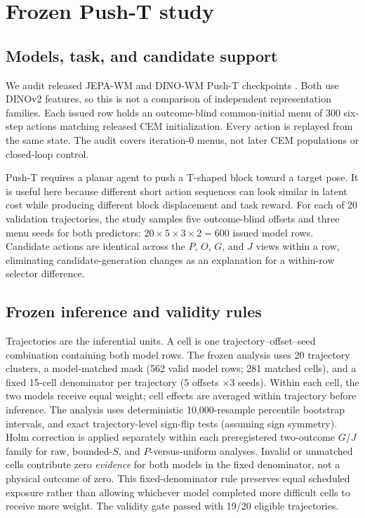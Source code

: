 \documentclass[letterpaper,10pt,conference]{ieeeconf}
\begin{document}
\section{Frozen Push-T study}

\subsection{Models, task, and candidate support}

We audit released JEPA-WM and DINO-WM Push-T checkpoints
\cite{terver2026drives,pmlr-v267-zhou25t}. Both use DINOv2 features, so this is
not a comparison of independent representation families. Each issued row holds
an outcome-blind common-initial menu of 300 six-step actions matching released
CEM initialization. Every action is replayed from the same state. The audit
covers iteration-0 menus, not later CEM populations or closed-loop control.

Push-T requires a planar agent to push a T-shaped block toward a target pose.
It is useful here because different short action sequences can look similar in
latent cost while producing different block displacement and task reward. For
each of 20 validation trajectories, the study samples five outcome-blind
offsets and three menu seeds for both predictors: $20\times5\times3\times2=600$
issued model rows. Candidate actions are identical across
the $P$, $O$, $G$, and $J$ views within a row, eliminating candidate-generation
changes as an explanation for a within-row selector difference.

\subsection{Frozen inference and validity rules}

Trajectories are the inferential units. A cell is one
trajectory--offset--seed combination containing both model rows. The frozen
analysis uses 20 trajectory clusters, a model-matched mask (562 valid model
rows; 281 matched cells), and a fixed 15-cell denominator per trajectory
($5$ offsets $\times3$ seeds). Within each cell, the two models receive equal
weight; cell effects are averaged within trajectory before inference. The
analysis uses deterministic
10,000-resample percentile bootstrap intervals, and exact trajectory-level
sign-flip tests (assuming sign symmetry). Holm correction is applied separately
within each preregistered two-outcome $G/J$ family for raw, bounded-$S$, and
$P$-versus-uniform analyses. Invalid or unmatched cells contribute zero
\emph{evidence} for both models in the fixed denominator, not a physical outcome
of zero. This fixed-denominator rule preserves equal scheduled exposure rather than
allowing whichever model completed more difficult cells to receive more
weight. The validity gate passed with 19/20 eligible trajectories.
\end{document}
